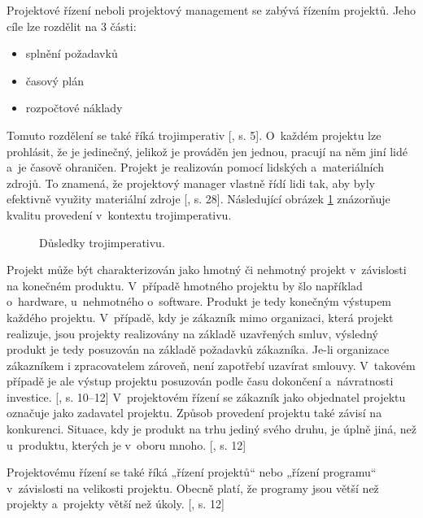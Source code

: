 \documentclass[
	11pt, oneside, printed, final, palatino
	microtype,
	table,   %
	lof,     %
	lot     %
]{fithesis3}
\newcommand{\citepages}[2]{[\cite{#2}, s. #1]}
\newcommand{\mezera}{\bigskip}
\begin{document}
{\indent Projektové řízení neboli projektový management se zabývá řízením projektů. Jeho cíle lze rozdělit na 3 části: 
\mezera
\begin{itemize}
\item splnění požadavků
\item časový plán
\item rozpočtové náklady
\end{itemize}

Tomuto rozdělení se také říká trojimperativ \citepages{5}{rosenau_2000}. O~každém projektu lze prohlásit, že je jedinečný, jelikož je prováděn jen jednou, pracují na něm jiní lidé a~je časově ohraničen. Projekt je realizován pomocí lidských a~materiálních zdrojů. To znamená, že projektový manager vlastně řídí lidi tak, aby byly efektivně využity materiální zdroje \citepages{28}{rehacek_2013}. Následující obrázek \ref{fig:trojimperativ} znázorňuje kvalitu provedení v~kontextu trojimperativu.

\begin{figure}
    \centering
	\def\svgwidth{1.0\textwidth}
    
	\caption{Důsledky trojimperativu.}
	\label{fig:trojimperativ}
\end{figure}

Projekt může být charakterizován jako hmotný či nehmotný projekt v~závislosti na konečném produktu. V~případě hmotného projektu by šlo například o~hardware, u~nehmotného o~software. Produkt je tedy konečným výstupem každého projektu.
V~případě, kdy je zákazník mimo organizaci, která projekt realizuje, jsou projekty realizovány na základě uzavřených smluv, výsledný produkt je tedy posuzován na základě požadavků zákazníka. Je-li organizace zákazníkem i zpracovatelem zároveň, není zapotřebí uzavírat smlouvy. V~takovém případě je ale výstup projektu posuzován podle času dokončení a~návratnosti investice. \citepages{10–12}{rosenau_2000}  V~projektovém řízení se zákazník jako objednatel projektu označuje jako zadavatel projektu. Způsob provedení projektu také závisí na konkurenci. Situace, kdy je produkt na trhu jediný svého druhu, je úplně jiná, než u~produktu, kterých je v~oboru mnoho. \citepages{12}{rosenau_2000}

Projektovému řízení se také říká „řízení projektů“ nebo „řízení programu“ v~závislosti na velikosti projektu. Obecně platí, že programy jsou větší než projekty a~projekty větší než úkoly. \citepages{12}{rosenau_2000}

}
\end{document}
